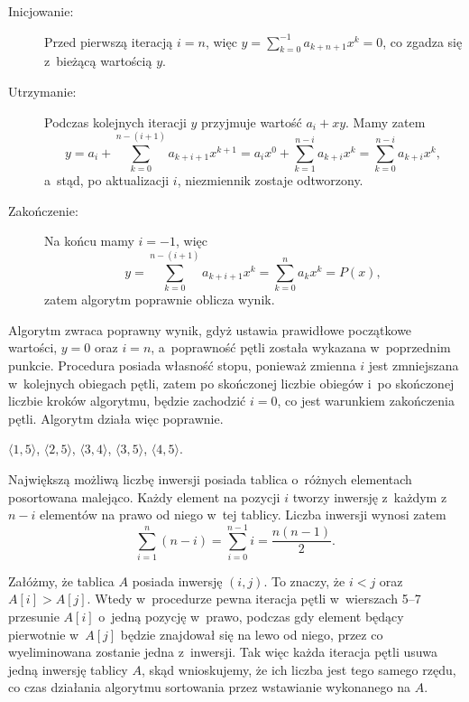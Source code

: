 \subproblem %
\begin{description}
	\item[Inicjowanie:] Przed pierwszą iteracją $i=n$, więc $y=\sum_{k=0}^{-1}a_{k+n+1}x^k=0$, co zgadza się z~bieżącą wartością $y$.
	\item[Utrzymanie:] Podczas kolejnych iteracji $y$ przyjmuje wartość $a_i+xy$. Mamy zatem
	\[
		y = a_i+\sum_{k=0}^{n-(i+1)}a_{k+i+1}x^{k+1} = a_ix^0+\sum_{k=1}^{n-i}a_{k+i}x^k = \sum_{k=0}^{n-i}a_{k+i}x^k,
	\]
	a~stąd, po aktualizacji $i$, niezmiennik zostaje odtworzony.
	\item[Zakończenie:] Na końcu mamy $i=-1$, więc
	\[
		y = \sum_{k=0}^{n-(i+1)}a_{k+i+1}x^k = \sum_{k=0}^na_kx^k = P(x),
	\]
	zatem algorytm poprawnie oblicza wynik.
\end{description}

\subproblem %
Algorytm zwraca poprawny wynik, gdyż ustawia prawidłowe początkowe wartości, $y=0$ oraz $i=n$, a~poprawność pętli  została wykazana w~poprzednim punkcie. Procedura posiada własność stopu, ponieważ zmienna $i$ jest zmniejszana w~kolejnych obiegach pętli, zatem po skończonej liczbie obiegów i~po skończonej liczbie kroków algorytmu, będzie zachodzić $i=0$, co jest warunkiem zakończenia pętli. Algorytm działa więc poprawnie.


\subproblem %
$\langle1,5\rangle$, $\langle2,5\rangle$, $\langle3,4\rangle$, $\langle3,5\rangle$, $\langle4,5\rangle$.

\subproblem %
Największą możliwą liczbę inwersji posiada tablica o~różnych elementach posortowana malejąco. Każdy element na pozycji $i$ tworzy inwersję z~każdym z~$n-i$ elementów na prawo od niego w~tej tablicy. Liczba inwersji wynosi zatem
\[
	\sum_{i=1}^n(n-i) = \sum_{i=0}^{n-1}i = \frac{n(n-1)}{2}.
\]

\subproblem %
Załóżmy, że tablica $A$ posiada inwersję $(i,j)$. To znaczy, że $i<j$ oraz $A[i]>A[j]$. Wtedy w~procedurze  pewna iteracja pętli  w~wierszach 5\nobreakdash--7 przesunie $A[i]$ o~jedną pozycję w~prawo, podczas gdy element będący pierwotnie w~$A[j]$ będzie znajdował się na lewo od niego, przez co wyeliminowana zostanie jedna z~inwersji. Tak więc każda iteracja pętli  usuwa jedną inwersję tablicy $A$, skąd wnioskujemy, że ich liczba jest tego samego rzędu, co czas działania algorytmu sortowania przez wstawianie wykonanego na $A$.

